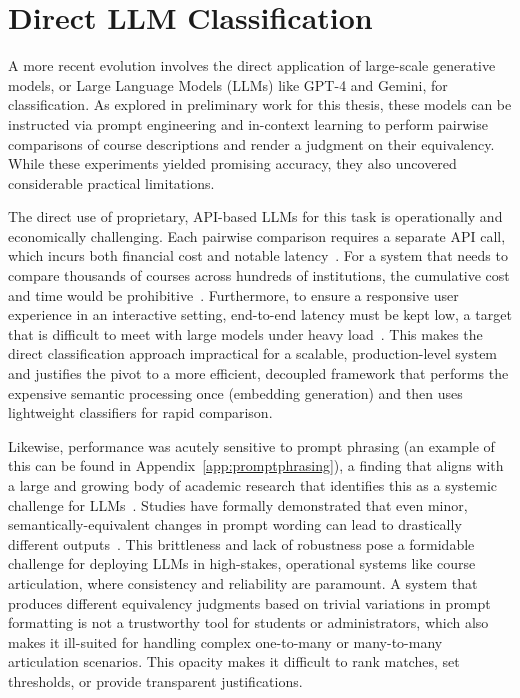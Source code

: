 \section{Direct LLM Classification}\label{ch:2.4}
A more recent evolution involves the direct application of large-scale generative models, or Large Language Models (LLMs) like GPT-4 and Gemini, for classification.  As explored in preliminary work for this thesis, these models can be instructed via prompt engineering and in-context learning to perform pairwise comparisons of course descriptions and render a judgment on their equivalency.  While these experiments yielded promising accuracy, they also uncovered considerable practical limitations.

The direct use of proprietary, API-based LLMs for this task is operationally and economically challenging. Each pairwise comparison requires a separate API call, which incurs both financial cost and notable latency~\cite{Sharma_2025,nvidia_2025}. For a system that needs to compare thousands of courses across hundreds of institutions, the cumulative cost and time would be prohibitive~\cite{Sharma_2025,nvidia_2025}. Furthermore, to ensure a responsive user experience in an interactive setting, end-to-end latency must be kept low, a target that is difficult to meet with large models under heavy load~\cite{nvidia_2025,Sharma_2025}. This makes the direct classification approach impractical for a scalable, production-level system and justifies the pivot to a more efficient, decoupled framework that performs the expensive semantic processing once (embedding generation) and then uses lightweight classifiers for rapid comparison.

Likewise, performance was acutely sensitive to prompt phrasing (an example of this can be found in Appendix~\ref{app:promptphrasing}), a finding that aligns with a large and growing body of academic research that identifies this as a systemic challenge for LLMs~\cite{razavi2025benchmarkingpromptsensitivitylarge,zhuo-etal-2024-prosa}. Studies have formally demonstrated that even minor, semantically-equivalent changes in prompt wording can lead to drastically different outputs~\cite{razavi2025benchmarkingpromptsensitivitylarge,zhuo-etal-2024-prosa}. This brittleness and lack of robustness pose a formidable challenge for deploying LLMs in high-stakes, operational systems like course articulation, where consistency and reliability are paramount. A system that produces different equivalency judgments based on trivial variations in prompt formatting is not a trustworthy tool for students or administrators, which also makes it ill-suited for handling complex one-to-many or many-to-many articulation scenarios.  This opacity makes it difficult to rank matches, set thresholds, or provide transparent justifications.

